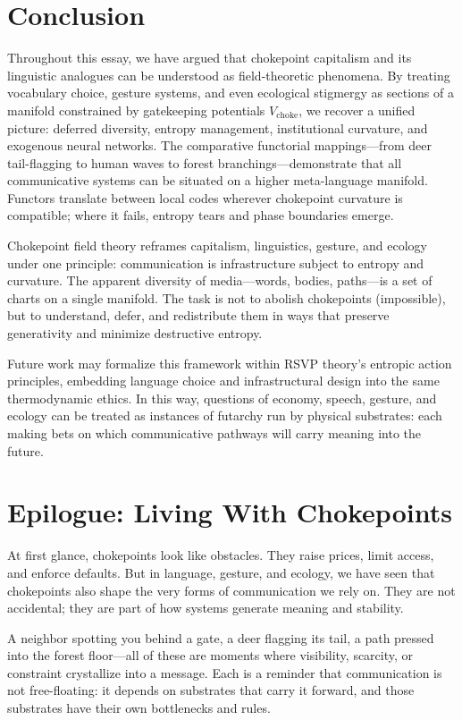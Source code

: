 \documentclass[12pt]{article}
\begin{document}
\section{Conclusion}
Throughout this essay, we have argued that chokepoint capitalism and its linguistic analogues can be understood as field-theoretic phenomena. By treating vocabulary choice, gesture systems, and even ecological stigmergy as sections of a manifold constrained by gatekeeping potentials $V_{\text{choke}}$, we recover a unified picture: deferred diversity, entropy management, institutional curvature, and exogenous neural networks. The comparative functorial mappings—from deer tail-flagging to human waves to forest branchings—demonstrate that all communicative systems can be situated on a higher meta-language manifold. Functors translate between local codes wherever chokepoint curvature is compatible; where it fails, entropy tears and phase boundaries emerge.

Chokepoint field theory reframes capitalism, linguistics, gesture, and ecology under one principle: communication is infrastructure subject to entropy and curvature. The apparent diversity of media—words, bodies, paths—is a set of charts on a single manifold. The task is not to abolish chokepoints (impossible), but to understand, defer, and redistribute them in ways that preserve generativity and minimize destructive entropy.

Future work may formalize this framework within RSVP theory’s entropic action principles, embedding language choice and infrastructural design into the same thermodynamic ethics. In this way, questions of economy, speech, gesture, and ecology can be treated as instances of futarchy run by physical substrates: each making bets on which communicative pathways will carry meaning into the future.

\section*{Epilogue: Living With Chokepoints}

At first glance, chokepoints look like obstacles. They raise prices, limit access, and enforce defaults. But in language, gesture, and ecology, we have seen that chokepoints also shape the very forms of communication we rely on. They are not accidental; they are part of how systems generate meaning and stability.

A neighbor spotting you behind a gate, a deer flagging its tail, a path pressed into the forest floor—all of these are moments where visibility, scarcity, or constraint crystallize into a message. Each is a reminder that communication is not free-floating: it depends on substrates that carry it forward, and those substrates have their own bottlenecks and rules.
\end{document}
